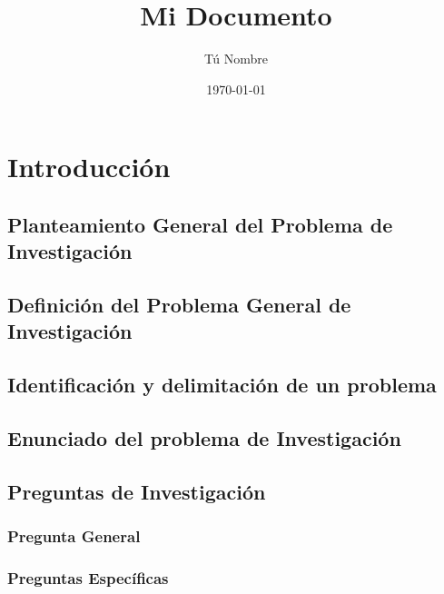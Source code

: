 \documentclass{article}
\title{Mi Documento}
\author{Tú Nombre}
\date{\today}
\begin{document}


\tableofcontents
\clearpage

\section{Introducción}

\subsection{Planteamiento General del Problema de Investigación }

\subsection{Definición del Problema General de Investigación}

\subsection{Identificación y delimitación de un problema}

\subsection{Enunciado del problema de Investigación}

\subsection{Preguntas de Investigación}
    \subsubsection{Pregunta General}
    \subsubsection{Preguntas Específicas}
\end{document}
